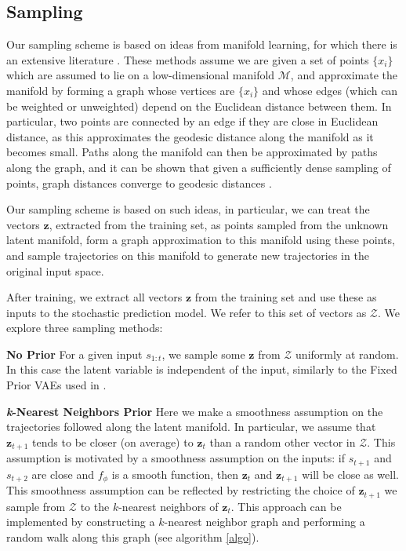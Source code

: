 \documentclass{article}
\begin{document}
\subsection{Sampling}

Our sampling scheme is based on ideas from manifold learning, for which there is an extensive literature \citep{isomap, LLE, Belkin2003, TSNE}.
These methods assume we are given a set of points $\{x_i\}$ which are assumed to lie on a low-dimensional manifold $\mathcal{M}$, and approximate the manifold by forming a graph whose vertices are $\{x_i\}$ and whose edges (which can be weighted or unweighted) depend on the Euclidean distance between them. In particular, two points are connected by an edge if they are close in Euclidean distance, as this approximates the geodesic distance along the manifold as it becomes small.
Paths along the manifold can then be approximated by paths along the graph, and it can be shown that given a sufficiently dense sampling of points, graph distances converge to geodesic distances \citep{Bernstein2000}.

Our sampling scheme is based on such ideas, in particular, we can treat the vectors $\bm{z}$, extracted from the training set, as points sampled from the unknown latent manifold, form a graph approximation to this manifold using these points, and sample trajectories on this manifold to generate new trajectories in the original input space.

After training, we extract all vectors $\bm{z}$ from the training set and use these as inputs to the stochastic prediction model.
We refer to this set of vectors as $\mathcal{Z}$.
We explore three sampling methods:

\textbf{No Prior} \quad
For a given input $s_{1:t}$, we sample some $\bm{z}$ from $\mathcal{Z}$ uniformly at random. In this case the latent variable is independent of the input, similarly to the Fixed Prior VAEs used in \citep{Denton18}.

\textbf{\emph{k}-Nearest Neighbors Prior} \quad
Here we make a smoothness assumption on the trajectories followed along the latent manifold.
In particular, we assume that $\bm{z}_{t+1}$ tends to be closer (on average) to $\bm{z}_t$ than a random other vector in $\mathcal{Z}$.
This assumption is motivated by a smoothness assumption on the inputs: if $s_{t+1}$ and $s_{t+2}$ are close and $f_\phi$ is a smooth function, then $\bm{z}_t$ and $\bm{z}_{t+1}$ will be close as well.
This smoothness assumption can be reflected by restricting the choice of $\bm{z}_{t+1}$ we sample from $\mathcal{Z}$ to the $k$-nearest neighbors of $\bm{z}_t$.
This approach can be implemented by constructing a $k$-nearest neighbor graph and performing a random walk along this graph (see algorithm \ref{algo}).
\end{document}
